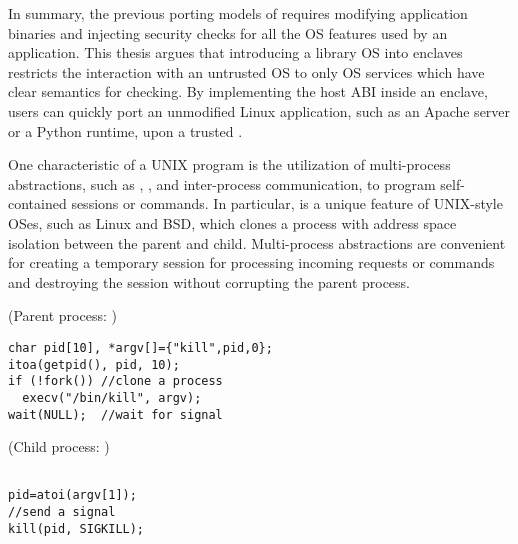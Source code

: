 In summary, the previous porting models of \sgx{} requires modifying application binaries and injecting security checks for all the OS features used by an application.
This thesis argues that introducing a library OS into enclaves
restricts the interaction with an untrusted OS to only OS services which have clear semantics for checking.
By implementing the host ABI inside an enclave,
users can quickly port an unmodified Linux application, such as an Apache server or a Python runtime, upon a trusted \libos{}.



\label{sec:intro:multiproc}


One characteristic of a UNIX program
is the utilization of multi-process abstractions,
such as , ,
and inter-process communication,
to program self-contained sessions or commands.
In particular,  is a unique feature of UNIX-style OSes, such as Linux and BSD,
which clones a process with address space isolation
between the parent and child.
Multi-process abstractions are convenient for creating a temporary session for processing incoming requests or commands and destroying the session without corrupting the parent process.



\begin{figure*}
\begin{minipage}[t]{.65\textwidth}
(Parent process: )
\lstset{basicstyle=\ttfamily\footnotesize,fontadjust=true,breaklines=true}
\begin{lstlisting}
char pid[10], *argv[]={"kill",pid,0};
itoa(getpid(), pid, 10);
if (!fork()) //clone a process
  execv("/bin/kill", argv);
wait(NULL);  //wait for signal
\end{lstlisting}
\end{minipage}
\begin{minipage}[t]{.33\textwidth}
(Child process: )
\lstset{basicstyle=\ttfamily\footnotesize,fontadjust=true,breaklines=true}
\begin{lstlisting}

pid=atoi(argv[1]);
//send a signal
kill(pid, SIGKILL);

\end{lstlisting}
\end{minipage}
\caption{Sample code for Linux applications using process cloning and inter-process communication (IPC).}
\label{fig:overview:proc-example}
\end{figure*}

